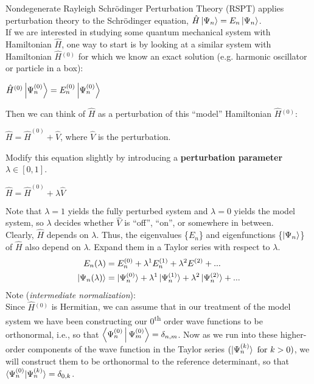 \documentclass{article}
\newcommand{\vsp}{\vspace{0.2cm}}
\newcommand{\z}{\ensuremath{^{(0)}}}
\newcommand{\one}{\ensuremath{^{(1)}}}
\newcommand{\tss}{\textsuperscript}
\begin{document}
Nondegenerate Rayleigh Schr{\"o}dinger Perturbation Theory (RSPT) applies perturbation theory to the Schr{\"o}dinger equation,  $\hat{H} \Ket{\Psi_n} = E_n \Ket{\Psi_n}$. \vsp \\
If we are interested in studying some quantum mechanical system with Hamiltonian $\hat{H}$, one way to start is by looking at a similar system with Hamiltonian $\hat{H}\z$ for which we know an exact solution (e.g. harmonic oscillator or particle in a box):
\begin{center}    $\hat{H}^{(0)} \Ket{\Psi^{(0)}_n} =  E^{(0)}_n \Ket{\Psi^{(0)}_n}$    \end{center}
Then we can think of $\hat{H}$ as a perturbation of this ``model'' Hamiltonian $\hat{H}\z$:
\begin{center} $\hat{H} = \hat{H}^{(0)} + \hat{V}$, where $\hat{V}$ is the perturbation. \end{center} 
Modify this equation slightly by introducing a {\bf perturbation parameter} $\lambda \in [0,1]$.
\begin{center} $\hat{H} = \hat{H}^{(0)} + \lambda \hat{V}$ \end{center}
Note that $\lambda=1$ yields the fully perturbed system and $\lambda=0$ yields the model system, so $\lambda$ decides whether $\hat{V}$ is ``off'', ``on'', or somewhere in between. \vsp \\
Clearly, $\hat{H}$ depends on $\lambda$. 
Thus, the eigenvalues \{$E_n$\} and eigenfunctions \{$\ket{\Psi_n}$\} of $\hat{H}$ also depend on $\lambda$. Expand them in a Taylor series with respect to $\lambda$. 
\begin{align*}
E_n (\lambda) &= E^{(0)}_n + \lambda^1 E\one_n + \lambda^2 E^{(2)}  + ... \\
\ket{\Psi_n (\lambda)} &= \ket{\Psi^{(0)}_n} + \lambda^1 \ket{\Psi^{(1)}_n} + \lambda^2 \ket{\Psi^{(2)}_n} + ...
\end{align*}
Note ({\it intermediate normalization}):  \vsp \\
Since $\hat{H}\z$ is Hermitian, we can assume that in our treatment of the model system we have been constructing our 0\tss{th} order wave functions to be orthonormal, i.e., so that $\Braket{\Psi^{(0)}_n | \Psi^{(0)}_m} = \delta_{n,m}$. Now as we run into these higher-order components of the wave function in the Taylor series $( \ket{\Psi_n^{(k)}} \text{ for } k > 0 ) $, we will construct them to be orthonormal to the reference determinant, so that $\braket{\Psi_n^{(0)} | \Psi_n^{(k)}} = \delta_{0,k} $. \vsp \\  
\end{document}
